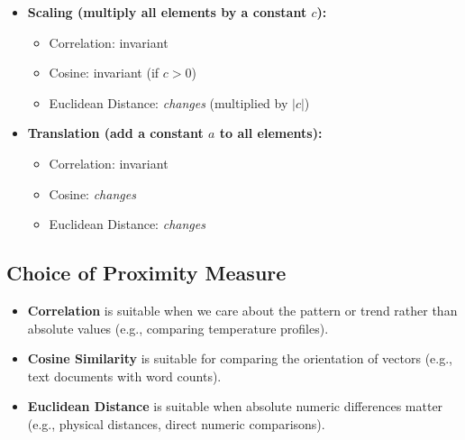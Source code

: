 \documentclass[a4paper,12pt]{article}
\begin{document}
\begin{itemize}
  \item \textbf{Scaling (multiply all elements by a constant $c$):}
  \begin{itemize}
    \item Correlation: invariant
    \item Cosine: invariant (if $c > 0$)
    \item Euclidean Distance: \emph{changes} (multiplied by $|c|$)
  \end{itemize}
  \item \textbf{Translation (add a constant $a$ to all elements):}
  \begin{itemize}
    \item Correlation: invariant
    \item Cosine: \emph{changes}
    \item Euclidean Distance: \emph{changes}
  \end{itemize}
\end{itemize}

\subsection*{Choice of Proximity Measure}

\begin{itemize}
  \item \textbf{Correlation} is suitable when we care about the pattern or trend rather than absolute values (e.g., comparing temperature profiles).
  \item \textbf{Cosine Similarity} is suitable for comparing the orientation of vectors (e.g., text documents with word counts).
  \item \textbf{Euclidean Distance} is suitable when absolute numeric differences matter (e.g., physical distances, direct numeric comparisons).
\end{itemize}
\end{document}
